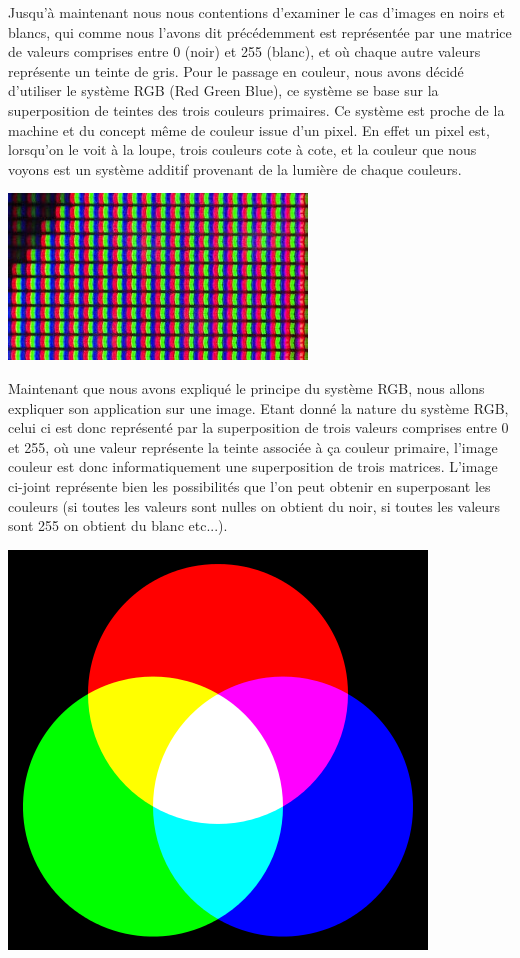 
 
 Jusqu'à maintenant nous nous contentions d'examiner le cas d'images en noirs et blancs, qui comme nous l'avons dit précédemment est représentée par une matrice de valeurs comprises entre 0 (noir) et 255 (blanc), et où chaque autre valeurs représente un teinte de gris. Pour le passage en couleur, nous avons décidé d'utiliser le système RGB (Red Green Blue), ce système se base sur la superposition de teintes des trois couleurs primaires. Ce système est proche de la machine et du concept même de couleur issue d'un pixel. En effet un pixel est, lorsqu'on le voit à la loupe, trois couleurs cote à cote, et la couleur que nous voyons est un système additif provenant de la lumière de chaque couleurs. 
 
 
\includegraphics[scale=0.5]{Images/pixel.jpg}
 
 
 Maintenant que nous avons expliqué le principe du système RGB, nous allons expliquer son application sur une image. Etant donné la nature du système RGB, celui ci est donc représenté par la superposition de trois valeurs comprises entre 0 et 255, où une valeur représente la teinte associée à ça couleur primaire, l'image couleur est donc informatiquement une superposition de trois matrices. L'image ci-joint représente bien les possibilités que l'on peut obtenir en superposant les couleurs (si toutes les valeurs sont nulles on obtient du noir, si toutes les valeurs sont 255 on obtient du blanc etc...).
 
 
 \includegraphics[scale=0.5]{Images/RGB.png}
 
